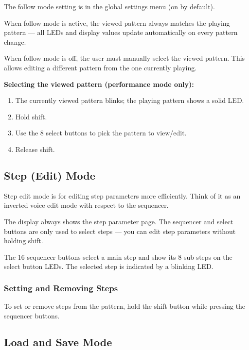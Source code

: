 The follow mode setting is in the global settings menu (on by default).

When follow mode is active, the viewed pattern always matches the
playing pattern --- all LEDs and display values update automatically on
every pattern change.

When follow mode is off, the user must manually select the viewed
pattern. This allows editing a different pattern from the one currently
playing.

\textbf{Selecting the viewed pattern (performance mode only):}

\begin{enumerate}
\def\labelenumi{\arabic{enumi}.}
\tightlist
\item
  The currently viewed pattern blinks; the playing pattern shows a solid
  LED.
\item
  Hold shift.
\item
  Use the 8 select buttons to pick the pattern to view/edit.
\item
  Release shift.
\end{enumerate}

\subsection{Step (Edit) Mode}\label{step-edit-mode}

Step edit mode is for editing step parameters more efficiently. Think of
it as an inverted voice edit mode with respect to the sequencer.

The display always shows the step parameter page. The sequencer and
select buttons are only used to select steps --- you can edit step
parameters without holding shift.

The 16 sequencer buttons select a main step and show its 8 sub steps on
the select button LEDs. The selected step is indicated by a blinking
LED.

\subsubsection{Setting and Removing
Steps}\label{setting-and-removing-steps}

To set or remove steps from the pattern, hold the shift button while
pressing the sequencer buttons.

\subsection{Load and Save Mode}\label{load-and-save-mode}


